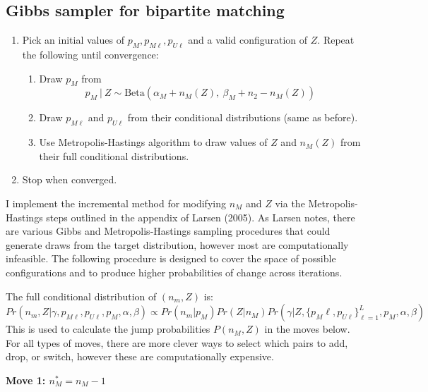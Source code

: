 \documentclass[11pt,reqno]{amsart}
\begin{document}
\subsection{Gibbs sampler for bipartite matching \citep{larsen_2005}}
\label{app:gibbsB}
\begin{enumerate} 
\item Pick an initial values of $p_M, p_{M\ell}, p_{U\ell}$ and a valid configuration of $Z$.  Repeat the following until convergence:
\begin{enumerate} 
\item Draw $p_M$ from $$ p_M\ |\ Z \sim \text{Beta}(\alpha_M + n_{M}(Z),\ \beta_M + n_{2} - n_{M}(Z)) $$ 

\item  Draw $p_{M\ell}$ and $p_{U\ell}$ from their conditional distributions (same as before).

\item Use Metropolis-Hastings algorithm to draw values of $Z$ and $n_{M}(Z)$ from their full conditional distributions. 

\end{enumerate}

\item Stop when converged. 
\end{enumerate}



I implement the incremental method for modifying $n_M$ and $Z$ via the Metropolis-Hastings steps outlined in the appendix of Larsen (2005).  As Larsen notes, there are various Gibbs and Metropolis-Hastings sampling procedures that could generate draws from the target distribution, however most are computationally infeasible.  The following procedure is designed to cover the space of possible configurations and to produce higher probabilities of change across iterations.  

The full conditional distribution of $(n_m, Z)$ is:
\begin{equation} 
Pr\left(n_m, Z | \gamma, p_{M\ell}, p_{U\ell}, p_M, \alpha, \beta \right) \propto Pr(n_m | p_M) Pr(Z | n_M) Pr\left(\gamma | Z,  \{p_M{\ell}, p_{U\ell}\}_{\ell=1}^L, p_M, \alpha, \beta \right) \label{nmZ} \end{equation}
This is used to calculate the jump probabilities $P(n_M, Z) $ in the moves below.  For all types of moves, there are more clever ways to select which pairs to add, drop, or switch, however these are computationally expensive. 

\textbf{Move 1: $n_M^* = n_M - 1 $ }
\end{document}
